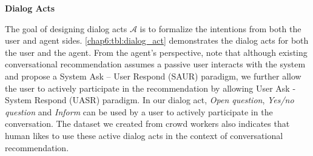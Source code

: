 \textbf{Dialog Acts}
\label{chap6:sec:dialog_act}

The goal of designing dialog acts $\mathcal{A}$ is to formalize the intentions from both the user and agent sides. 
\ref{chap6:tbl:dialog_act} demonstrates the dialog acts for both the user and the agent.
From the agent's perspective, 
note that although existing conversational recommendation\cite{sun2018conversational,li2018towards,zhang2018towards} assumes a passive user interacts with the system and propose a System Ask – User Respond (SAUR) paradigm, we further allow the user to actively participate in the recommendation by allowing User Ask - System Respond (UASR) paradigm. In our dialog act, \textit{Open question}, \textit{Yes/no question} and \textit{Inform} can be used by a user to actively participate in the conversation. The dataset we created from crowd workers also indicates that human likes to use these active dialog acts in the context of conversational recommendation.


